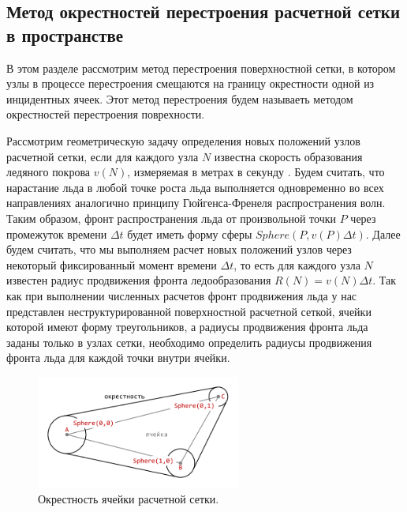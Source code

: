 \subsection{Метод окрестностей перестроения расчетной сетки \\ в пространстве}

В этом разделе рассмотрим метод перестроения поверхностной сетки, в котором узлы в процессе перестроения смещаются на границу окрестности одной из инцидентных ячеек.
Этот метод перестроения будем называеть методом окрестностей перестроения поврехности\label{term:method_remesh_okr}.

Рассмотрим геометрическую задачу определения новых положений узлов расчетной сетки, если для каждого узла $N$ известна скорость образования ледяного покрова $v(N)$, измеряемая в метрах в секунду \cite{Rybakov2023GeoRemesh}.
Будем считать, что нарастание льда в любой точке роста льда выполняется одновременно во всех направлениях аналогично принципу Гюйгенса-Френеля распространения волн.
Таким образом, фронт распространения льда от произвольной точки $P$ через промежуток времени $\Delta t$ будет иметь форму сферы $Sphere(P, v(P)\Delta t)$.
Далее будем считать, что мы выполняем расчет новых положений узлов через некоторый фиксированный момент времени $\Delta t$, то есть для каждого узла $N$ известен радиус продвижения фронта ледообразования $R(N) = v(N) \Delta t$.
Так как при выполнении численных расчетов фронт продвижения льда у нас представлен неструктурированной поверхностной расчетной сеткой, ячейки которой имеют форму треугольников, а радиусы продвижения фронта льда заданы только в узлах сетки, необходимо определить радиусы продвижения фронта льда для каждой точки внутри ячейки.

\begin{figure}[ht]
\centering
\includegraphics[width=0.6\textwidth]{./pics/text_1_remesh_common_envelope/triangle.pdf}
\singlespacing
{}\caption{Окрестность ячейки расчетной сетки.}
\label{fig:text_1_remesh_common_envelope_1}
\end{figure}


